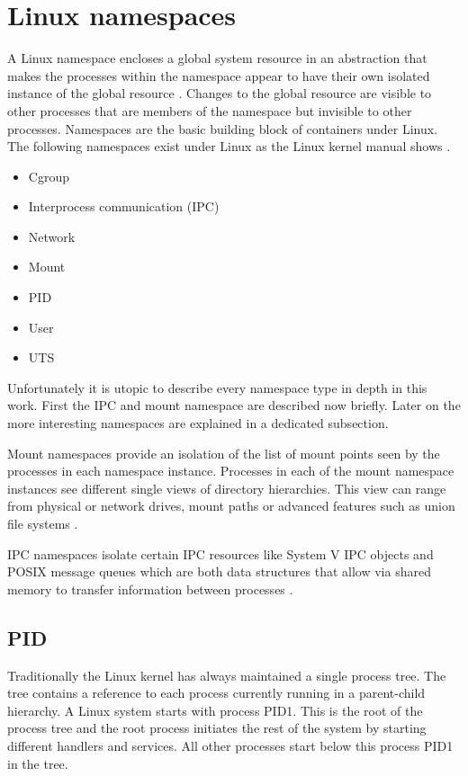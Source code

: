 \section{Linux namespaces}
\label{sec:intro:containerization:linux_namespaces}
A Linux namespace encloses a global system resource in an abstraction that makes the processes within the namespace appear to have their own isolated instance of the global resource \cite{ns}.
Changes to the global resource are visible to other processes that are members of the namespace but invisible to other processes.
Namespaces are the basic building block of containers under Linux. The following namespaces exist under Linux as the Linux kernel manual shows \cite{ns}.
\begin{itemize}
\item Cgroup
\item Interprocess communication (IPC)
\item Network
\item Mount
\item PID
\item User
\item UTS
\end{itemize}
Unfortunately it is utopic to describe every namespace type in depth in this work. 
First the IPC and mount namespace are described now briefly.
Later on the more interesting namespaces are explained in a dedicated subsection.

Mount namespaces provide an isolation of the list of mount points seen by the processes in each namespace instance.
Processes in each of the mount namespace instances see different single views of directory hierarchies.
This view can range from physical or network drives, mount paths or advanced features such as union file systems \cite{mountns}.

IPC namespaces isolate certain IPC resources like System V IPC objects and POSIX message queues which are both data structures that allow via shared memory to transfer information between processes \cite{ipcns}.

\subsection{PID}
\label{sec:intro:containerization:linux_namespaces:pid_namespaces}
Traditionally the Linux kernel has always maintained a single process tree. 
The tree contains a reference to each process currently running in a parent-child hierarchy. 
A Linux system starts with process PID1. 
This is the root of the process tree and the root process initiates the rest of the system by starting different handlers and services. 
All other processes start below this process PID1 in the tree. 

